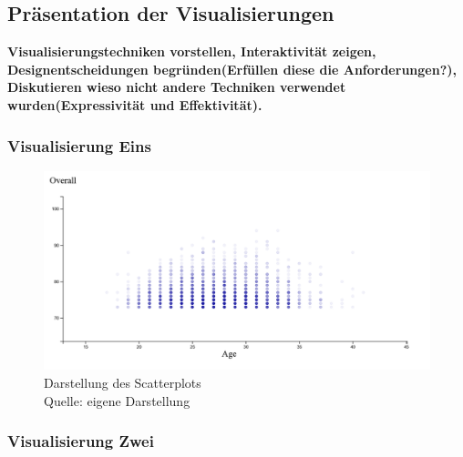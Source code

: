 \documentclass[usegeometry=true]{scrartcl}
\begin{document}
\subsection{Präsentation der Visualisierungen}


\textbf{Visualisierungstechniken vorstellen, Interaktivität zeigen, Designentscheidungen begründen(Erfüllen diese die Anforderungen?), Diskutieren wieso nicht andere Techniken verwendet wurden(Expressivität und Effektivität).}
\subsubsection{Visualisierung Eins}

\begin{figure}[h]
\centering
\includegraphics[scale=0.4]{grafiken/Scatterplot1}
\caption{Darstellung des Scatterplots\\ Quelle: eigene Darstellung}
\end{figure}


\subsubsection{Visualisierung Zwei}
\end{document}
